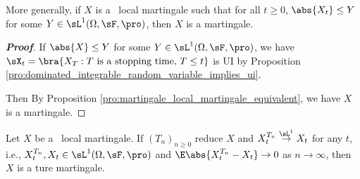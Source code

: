 %
%
%

\begin{corollary}\label{cor:local_martingale_dominated_martingale}
More generally, if $X$ is a \cadlag\ local martingale such that for all $t \geq 0$, $\abs{X_t} \leq Y$ for some $Y\in \sL^1(\Omega,\sF,\pro)$, then $X$ is a martingale.
\end{corollary}

\begin{proof}[\bf Proof]
If $\abs{X}\leq Y$ for some $Y\in \sL^1(\Omega,\sF,\pro)$, we have $\sX_t = \bra{X_T : T \text{ is a stopping time, }T \leq t}$ is UI by Proposition \ref{pro:dominated_integrable_random_variable_implies_ui}.

Then By Proposition \ref{pro:martingale_local_martingale_equivalent}, we have $X$ is a martingale. %
\end{proof}

\begin{theorem}\label{thm:local_martingale_martingale_sl1_convergence}
Let $X$ be a \cadlag\ local martingale. If $(T_n)_{n\geq 0}$ reduce $X$ and $X^{T_n}_t \stackrel{\sL^1}{\to} X_t$ for any $t$, i.e., $X^{T_n}_t,X_t \in \sL^1(\Omega,\sF,\pro)$ and $\E\abs{X^{T_n}_t - X_t} \to 0$ as $n\to \infty$, then $X$ is a ture martingale.
\end{theorem}

